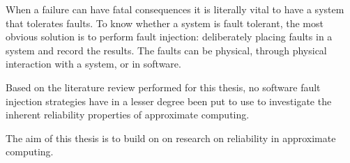 

When a failure can have fatal consequences it is literally vital to have a system that tolerates faults. To know whether a system is fault tolerant, the most obvious solution is to perform fault injection: deliberately placing faults in a system and record the results. The faults can be physical, through physical interaction with a system, or in software. 

Based on the literature review performed for this thesis, no software fault injection strategies have in a lesser degree been put to use to investigate the inherent reliability properties of approximate computing.


The aim of this thesis is to build on on research on reliability in approximate computing.

